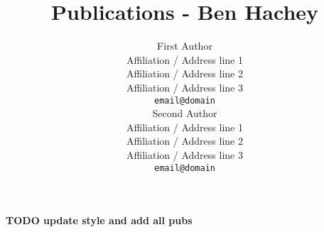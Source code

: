 \documentclass[11pt]{article}
\title{Publications - Ben Hachey}
\author{First Author \\
  Affiliation / Address line 1 \\
  Affiliation / Address line 2 \\
  Affiliation / Address line 3 \\
  {\tt email@domain} \\\And
  Second Author \\
  Affiliation / Address line 1 \\
  Affiliation / Address line 2 \\
  Affiliation / Address line 3 \\
  {\tt email@domain} \\}
\date{}
\begin{document}
\maketitle


{\bf TODO update style and add all pubs}


\nocite{thomas14newton}




\end{document}
